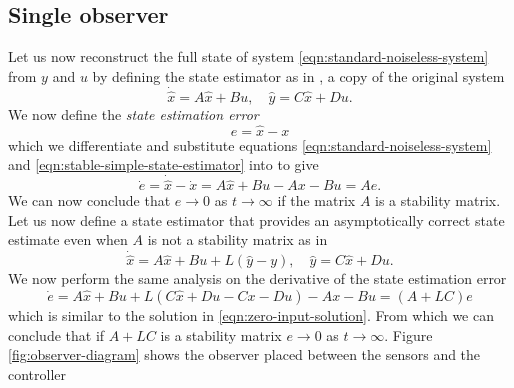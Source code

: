 \subsection{Single observer}\label{subsec:single-observer}
Let us now reconstruct the full state of system \eqref{eqn:standard-noiseless-system} from  $y$ and $u$ by defining the state estimator as in \cite[Section 16.5]{Hespanha2018LinearTheory}, a copy of the original system
\begin{equation}\label{eqn:stable-simple-state-estimator}
    \dot{\hat{x}} = A\hat{x} + Bu, \quad \hat{y} = C\hat{x} + Du.
\end{equation}
We now define the \textit{state estimation error}
\begin{equation}\label{eqn:estimate-error}
    e = \hat{x} - x
\end{equation}
which we differentiate and substitute equations \eqref{eqn:standard-noiseless-system} and \eqref{eqn:stable-simple-state-estimator} into to give
\begin{equation*}
    \dot{e} = \dot{\hat{x}} - \dot{x} = A\hat{x} + Bu - Ax - Bu = Ae.
\end{equation*}
We can now conclude that $e \rightarrow 0$ as $t \rightarrow \infty$ if the matrix $A$ is a stability matrix. Let us now define a state estimator that provides an asymptotically correct state estimate even when $A$ is not a stability matrix as in \cite[Section 16.5]{Hespanha2018LinearTheory}
\begin{equation}\label{eqn:unstable-simple-state-estimator}
    \dot{\hat{x}} = A\hat{x} + Bu + L(\hat{y} - y), \quad \hat{y} = C\hat{x} + Du.
\end{equation}
We now perform the same analysis on the derivative of the state estimation error
\begin{equation*}\label{eqn:error-linear-observer}
    \dot{e} = A\hat{x} + Bu + L(C\hat{x} + Du - Cx - Du) - Ax - Bu = (A+LC)e
\end{equation*}
which is similar to the solution in \eqref{eqn:zero-input-solution}. From which we can conclude that if $A+LC$ is a stability matrix $e \rightarrow 0$ as $t \rightarrow \infty$. Figure \ref{fig:observer-diagram} shows the observer placed between the sensors and the controller

